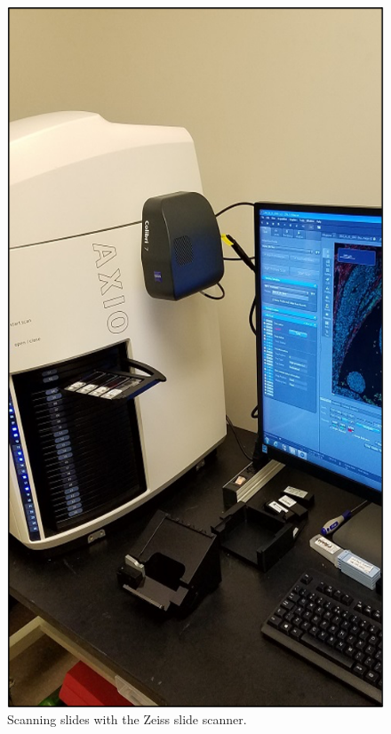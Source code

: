 \documentclass[
]{book}
\begin{document}
\begin{figure}

{\centering \includegraphics[width=7.25in,height=0.4\textheight]{images/Methods/imaging/scan} 

}

\caption{Scanning slides with the Zeiss slide scanner.}\label{fig:unnamed-chunk-4}
\end{figure}
\end{document}
